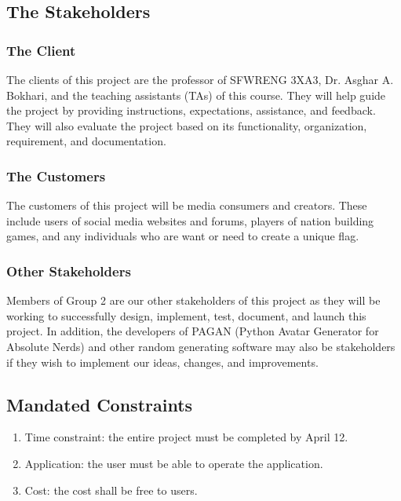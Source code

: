 \documentclass[12pt, titlepage]{article}
\begin{document}
\subsection{The Stakeholders}

\subsubsection{The Client}

The clients of this project are the professor of SFWRENG 3XA3, Dr. Asghar A. Bokhari, and the teaching assistants (TAs) of this course. They will help guide the project by providing instructions, expectations, assistance, and feedback. They will also evaluate the project based on its functionality, organization, requirement, and documentation.

\subsubsection{The Customers}

The customers of this project will be media consumers and creators. These include users of social media websites and forums, players of nation building games, and any individuals who are want or need to create a unique flag.

\subsubsection{Other Stakeholders}

Members of Group 2 are our other stakeholders of this project as they will be working to successfully design, implement, test, document, and launch this project. In addition, the developers of PAGAN (Python Avatar Generator for Absolute Nerds) and other random generating software may also be stakeholders if they wish to implement our ideas, changes, and improvements.

\subsection{Mandated Constraints}

\begin{enumerate}
    \item Time constraint: the entire project must be completed by April 12.
    \item Application: the user must be able to operate the application.
    \item Cost: the cost shall be free to users.
  \end{enumerate}
\end{document}

